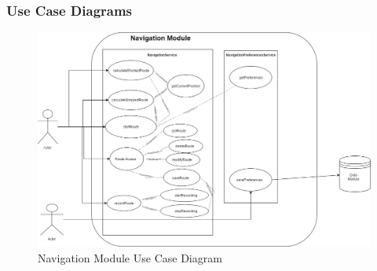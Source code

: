 \documentclass{article}
\begin{document}
        \subsubsection{Use Case Diagrams}
        \begin{figure}[H]
        	\includegraphics[width=\textwidth]{Navigation_Use_Case_Diagram}
            \caption{Navigation Module Use Case Diagram}
        \end{figure}
\end{document}
